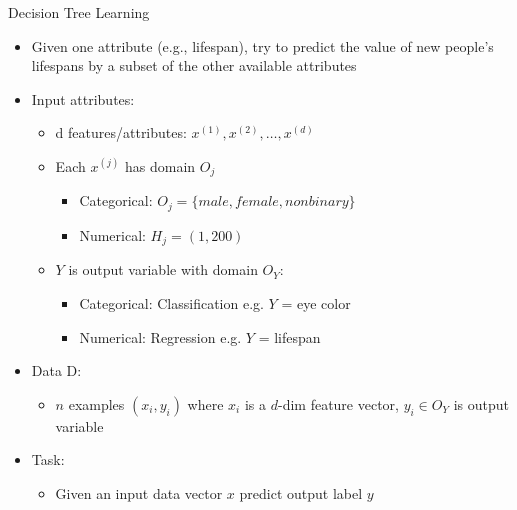 \begin{frame}{Decision Tree Learning}
    \begin{itemize}
        \item Given one attribute (e.g., lifespan), try to predict the value of new people’s lifespans by a subset of the other available attributes

        \item Input attributes:
        \begin{itemize}
            \item d features/attributes: $x^{(1)}, x^{(2)}, \ldots, x^{(d)}$
            \item Each $x^{(j)}$ has domain $O_j$
            \begin{itemize}
                \item Categorical: $O_j = \{male, female, nonbinary\}$
                \item Numerical: $H_j = (1, 200)$
            \end{itemize}
            \item $Y$ is output variable with domain $O_Y$:
            \begin{itemize}
                \item Categorical: Classification e.g. $Y$ = eye color
                \item Numerical: Regression e.g. $Y$ = lifespan
            \end{itemize}
        \end{itemize}

        \item Data D:
        \begin{itemize}
            \item $n$ examples $(x_i, y_i)$ where $x_i$ is a $d$-dim feature vector, $y_i \in O_Y$ is output variable
        \end{itemize}

        \item Task:
        \begin{itemize}
            \item Given an input data vector $x$ predict output label $y$
        \end{itemize}
    \end{itemize}
\end{frame}


